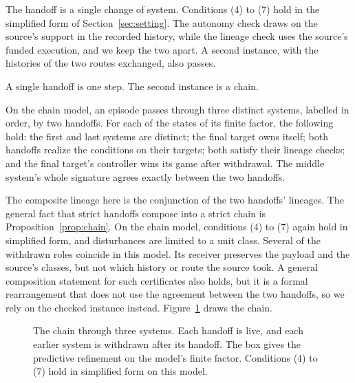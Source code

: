 The handoff is a single change of system. Conditions (4) to (7) hold in the
simplified form of Section~\ref{sec:setting}. The autonomy check draws on the
source's support in the recorded history, while the lineage check uses the
source's funded execution, and we keep the two apart. A second instance, with
the histories of the two routes exchanged, also passes.

A single handoff is one step. The second instance is a chain.

\begin{proposition}
\label{prop:chain-instance}
On the chain model, an episode passes through three distinct systems, labelled
\snapGSevenStrictChainSystemIds{} in order, by two handoffs. For each of the
\snapGSevenNativeFactorStates{} states of its finite factor, the following hold:
the first and last systems are distinct; the final target owns itself; both
handoffs realize the conditions on their targets; both satisfy their lineage
checks; and the final target's controller wins its game after withdrawal. The
middle system's whole signature agrees exactly between the two handoffs.
\end{proposition}

The composite lineage here is the conjunction of the two handoffs' lineages.
The general fact that strict handoffs compose into a strict chain is
Proposition~\ref{prop:chain}. On the chain model, conditions (4) to (7) again
hold in simplified form, and disturbances are limited to a unit class. Several
of the withdrawn roles coincide in this model. Its receiver preserves the
payload and the source's classes, but not which history or route the source
took. A general composition statement for such certificates also holds, but it is a
formal rearrangement that does not use the agreement between the two
handoffs, so we rely on the checked instance instead.
Figure~\ref{fig:chain} draws the chain.

\begin{figure}[tbp]
\centering

\caption{The chain through three systems. Each handoff is live, and each earlier system is withdrawn after its handoff. The box gives the predictive refinement on the model's finite factor. Conditions (4) to (7) hold in simplified form on this model.}
\label{fig:chain}
\end{figure}
